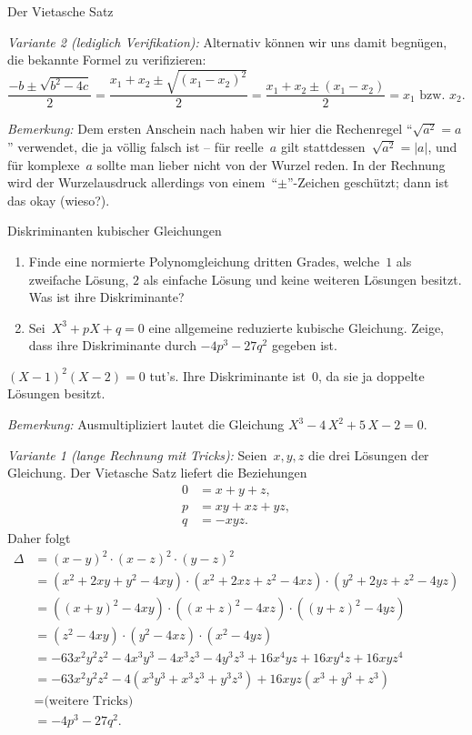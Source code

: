 \documentclass{algblatt}
\begin{document}
\begin{aufgabe}{Der Vietasche Satz}
\begin{loesungE}
\emph{Variante 2 (lediglich Verifikation):} Alternativ können wir uns damit
begnügen, die bekannte Formel zu verifizieren:
\[ \frac{-b \pm \sqrt{b^2 - 4c}}{2} =
  \frac{x_1 + x_2 \pm \sqrt{(x_1 - x_2)^2}}{2} =
  \frac{x_1 + x_2 \pm (x_1 - x_2)}{2} =
  \text{$x_1$ bzw. $x_2$}. \]

\emph{Bemerkung:} Dem ersten Anschein nach haben wir hier die Rechenregel
"`$\sqrt{a^2} = a$"' verwendet, die ja völlig falsch ist -- für reelle~$a$ gilt
stattdessen~$\sqrt{a^2} = |a|$, und für komplexe~$a$ sollte man lieber nicht
von der Wurzel reden. In der Rechnung wird der Wurzelausdruck allerdings von
einem~"`$\pm$"'-Zeichen geschützt; dann ist das okay (wieso?).
\end{loesungE}
\end{aufgabe}

\begin{aufgabe}{Diskriminanten kubischer Gleichungen}
\begin{enumerate}
\item Finde eine normierte Polynomgleichung dritten Grades, welche~$1$
als zweifache Lösung, $2$ als einfache Lösung und keine weiteren Lösungen
besitzt. Was ist ihre Diskriminante?
\item Sei~$X^3 + p X + q = 0$ eine allgemeine reduzierte kubische Gleichung.
Zeige, dass ihre Diskriminante durch $-4 p^3 - 27 q^2$ gegeben ist.
\end{enumerate}
\begin{loesungE}
\item $(X - 1)^2 (X - 2) = 0$ tut's. Ihre Diskriminante ist~$0$, da sie ja
doppelte Lösungen besitzt.

\emph{Bemerkung:} Ausmultipliziert lautet die Gleichung $X^3 - 4\,X^2 + 5\,X -
2 = 0$.

\item \emph{Variante 1 (lange Rechnung mit Tricks):} Seien~$x,y,z$ die drei Lösungen der
Gleichung. Der Vietasche Satz liefert die Beziehungen
\begin{align*}
  0 &= x+y+z, \\
  p &= xy + xz + yz, \\
  q &= -xyz.
\end{align*}
Daher folgt
\begin{align*}
  \Delta &= (x-y)^2 \cdot (x-z)^2 \cdot (y-z)^2 \\
  &= (x^2+2xy+y^2-4xy) \cdot (x^2+2xz+z^2-4xz) \cdot (y^2+2yz+z^2-4yz) \\
  &= ((x+y)^2-4xy) \cdot ((x+z)^2-4xz) \cdot ((y+z)^2-4yz) \\
  &= (z^2-4xy) \cdot (y^2-4xz) \cdot (x^2-4yz) \\
  &= -63x^2y^2z^2 -4x^3y^3 - 4x^3z^3 - 4y^3z^3 + 16x^4yz + 16xy^4z + 16xyz^4 \\
  &= -63x^2y^2z^2 - 4(x^3y^3 + x^3z^3 + y^3z^3) + 16 xyz (x^3+y^3+z^3) \\
  &= \text{(weitere Tricks)} \\
  &= -4p^3 - 27q^2.
\end{align*}


\end{loesungE}
\end{aufgabe}
\end{document}
